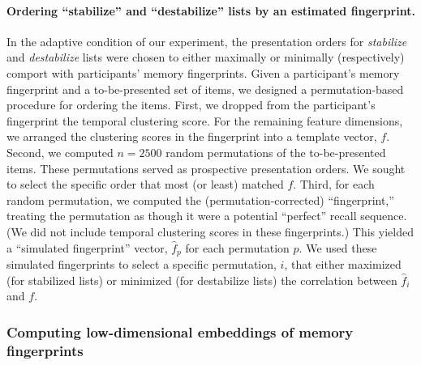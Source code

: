 \documentclass[11pt]{article}
\begin{document}
\paragraph{Ordering ``stabilize'' and ``destabilize'' lists by an estimated
fingerprint.}

In the adaptive condition of our experiment, the presentation orders for
\textit{stabilize} and \textit{destabilize} lists were chosen to either
maximally or minimally (respectively) comport with participants' memory
fingerprints. Given a participant's memory fingerprint and a to-be-presented
set of items, we designed a permutation-based procedure for ordering the items.
First, we dropped from the participant's fingerprint the temporal clustering
score. For the remaining feature dimensions, we arranged the clustering scores
in the fingerprint into a template vector, $f$. Second, we computed $n = 2500$
random permutations of the to-be-presented items. These permutations served as
prospective presentation orders. We sought to select the specific order that
most (or least) matched $f$. Third, for each random permutation, we computed
the (permutation-corrected) ``fingerprint,'' treating the permutation as though
it were a potential ``perfect'' recall sequence. (We did not include temporal
clustering scores in these fingerprints.) This yielded a ``simulated fingerprint''
vector, $\hat{f}_p$ for each permutation $p$.  We used these simulated fingerprints to
select a specific permutation, $i$, that either maximized (for stabilized lists) or minimized (for destabilize lists)
the correlation between $\hat{f}_i$ and $f$.

\subsubsection*{Computing low-dimensional embeddings of memory fingerprints}
\end{document}
